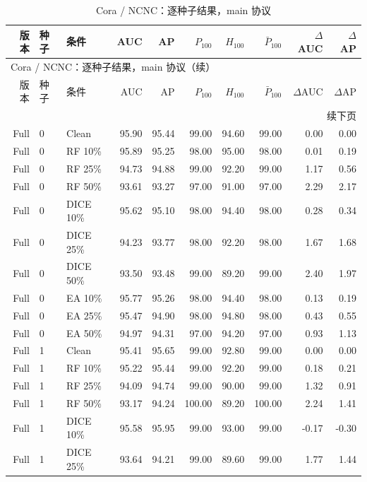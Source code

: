 {\footnotesize
\setlength{\tabcolsep}{3.2pt}
\renewcommand{\arraystretch}{1.10}
\begin{longtable}{rllrrrrrrr}
\caption{Cora / NCNC：逐种子结果，main 协议}\\
\toprule
版本 & 种子 & 条件 & AUC & AP & $P_{100}$ & $H_{100}$ & $\bar P_{100}$ & $\Delta$AUC & $\Delta$AP \\
\midrule
\endfirsthead
\multicolumn{10}{l}{Cora / NCNC：逐种子结果，main 协议（续）}\\
\toprule
版本 & 种子 & 条件 & AUC & AP & $P_{100}$ & $H_{100}$ & $\bar P_{100}$ & $\Delta$AUC & $\Delta$AP \\
\midrule
\endhead
\midrule\multicolumn{10}{r}{续下页}\\
\endfoot
\bottomrule
\endlastfoot
Full & 0 & Clean & 95.90 & 95.44 & 99.00 & 94.60 & 99.00 & 0.00 & 0.00 \\
Full & 0 & RF 10\% & 95.89 & 95.25 & 98.00 & 95.00 & 98.00 & 0.01 & 0.19 \\
Full & 0 & RF 25\% & 94.73 & 94.88 & 99.00 & 92.20 & 99.00 & 1.17 & 0.56 \\
Full & 0 & RF 50\% & 93.61 & 93.27 & 97.00 & 91.00 & 97.00 & 2.29 & 2.17 \\
Full & 0 & DICE 10\% & 95.62 & 95.10 & 98.00 & 94.40 & 98.00 & 0.28 & 0.34 \\
Full & 0 & DICE 25\% & 94.23 & 93.77 & 98.00 & 92.20 & 98.00 & 1.67 & 1.68 \\
Full & 0 & DICE 50\% & 93.50 & 93.48 & 99.00 & 89.20 & 99.00 & 2.40 & 1.97 \\
Full & 0 & EA 10\% & 95.77 & 95.26 & 98.00 & 94.40 & 98.00 & 0.13 & 0.19 \\
Full & 0 & EA 25\% & 95.47 & 94.90 & 98.00 & 94.80 & 98.00 & 0.43 & 0.55 \\
Full & 0 & EA 50\% & 94.97 & 94.31 & 97.00 & 94.20 & 97.00 & 0.93 & 1.13 \\
Full & 1 & Clean & 95.41 & 95.65 & 99.00 & 92.80 & 99.00 & 0.00 & 0.00 \\
Full & 1 & RF 10\% & 95.22 & 95.44 & 99.00 & 92.20 & 99.00 & 0.18 & 0.21 \\
Full & 1 & RF 25\% & 94.09 & 94.74 & 99.00 & 90.00 & 99.00 & 1.32 & 0.91 \\
Full & 1 & RF 50\% & 93.17 & 94.24 & 100.00 & 89.20 & 100.00 & 2.24 & 1.41 \\
Full & 1 & DICE 10\% & 95.58 & 95.95 & 99.00 & 93.00 & 99.00 & -0.17 & -0.30 \\
Full & 1 & DICE 25\% & 93.64 & 94.21 & 99.00 & 89.60 & 99.00 & 1.77 & 1.44 \\

\end{longtable}}
